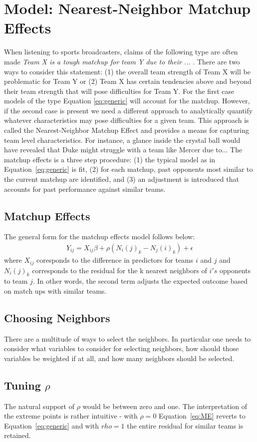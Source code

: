 \section{Model: Nearest-Neighbor Matchup Effects}
When listening to sports broadcasters, claims of the following type are often made \emph{Team X is a tough matchup for team Y due to their ... }.  There are two ways to consider this statement: (1) the overall team strength of Team X will be problematic for Team Y or (2) Team X has certain tendencies above and beyond their team strength that will pose difficulties for Team Y.  For the first case models of the type Equation \ref{eq:generic} will account for the matchup.  However, if the second case is present we need a different approach to analytically quantify whatever characteristics may pose difficulties for a given team.  This approach is called the Nearest-Neighbor Matchup Effect and provides a means for capturing team level characteristics.  For instance, a glance inside the crystal ball would have revealed that Duke might struggle with a team like Mercer due to...  The matchup effects is a three step procedure: (1)  the typical model as in Equation~\ref{eq:generic} is fit, (2) for each matchup, past opponents most similar to the current matchup are identified, and (3) an adjustment is introduced that accounts for past performance against similar teams. 
\subsection{Matchup Effects}
The general form for the matchup effects model follows below:
\begin{eqnarray}
Y_{ij} = X_{ij} \beta + \rho( N_i(j)_k-N_j(i)_k) + \epsilon
\label{eq:ME}
\end{eqnarray}
where $X_{ij}$ coresponds to the difference in predictors for teams $i$ and $j$ and $ N_i(j)_k$ corresponds to the residual for the k nearest neighbors of $i's$ opponents to team $j$.  In other words, the second term adjusts the expected outcome based on match ups with similar teams.
\subsection{Choosing Neighbors}
There are a multitude of ways to select the neighbors.  In particular one needs to consider what variables to consider for selecting neighbors, how should those variables be weighted if at all, and how many neighbors should be selected.   
\subsection{Tuning $\rho$}
The natural support of $\rho$ would be between zero and one.  The interpretation of the extreme points is rather intuitive - with $\rho = 0$ Equation~\ref{eq:ME} reverts to Equation~\ref{eq:generic} and with $rho = 1$ the entire residual for similar teams is retained.
